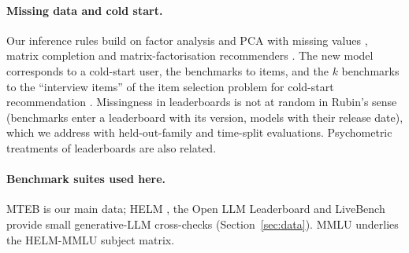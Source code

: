 \paragraph{Missing data and cold start.}
Our inference rules build on factor analysis and PCA with missing values \citep{ilin2010pca}, matrix completion \citep{candes2009exact} and matrix-factorisation recommenders \citep{koren2009mf}. The new model corresponds to a cold-start user, the benchmarks to items, and the $k$ benchmarks to the ``interview items'' of the item selection problem for cold-start recommendation \citep{meng2020item}. Missingness in leaderboards is not at random in Rubin's sense \citep{rubin1976missing} (benchmarks enter a leaderboard with its version, models with their release date), which we address with held-out-family and time-split evaluations. Psychometric treatments of leaderboards \citep{federiakin2025psychometric} are also related.

\paragraph{Benchmark suites used here.}
MTEB \citep{muennighoff2022mteb} is our main data; HELM \citep{liang2022helm}, the Open LLM Leaderboard and LiveBench provide small generative-LLM cross-checks (Section~\ref{sec:data}). MMLU \citep{hendrycks2020mmlu} underlies the HELM-MMLU subject matrix.
